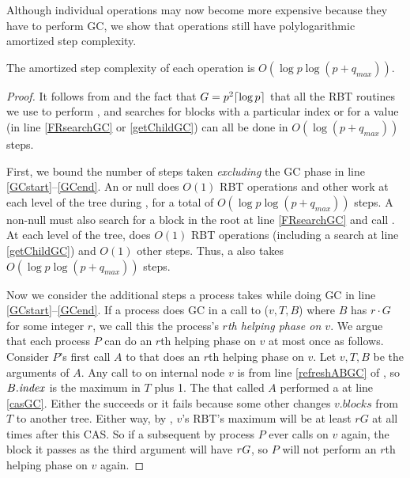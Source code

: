 Although individual operations may now become more expensive because they have to perform GC,
we show that operations still have polylogarithmic amortized step complexity.

\begin{proposition}
The amortized step complexity of each operation is $O(\log p \log(p+q_{max}))$.
\end{proposition}
\begin{proof}
It follows from  and the fact that $G=p^2\lceil \log p \rceil$
that all the RBT routines we use to perform ,  and searches for
blocks with a particular index or for a  value (in line \ref{FRsearchGC} or \ref{getChildGC}) can all be done in $O(\log(p+q_{max}))$ steps.

First, we bound the number of steps taken \emph{excluding} the GC phase in line \ref{GCstart}--\ref{GCend}.
An  or null  does $O(1)$ RBT operations and other work at each level of the tree during ,
for a total of $O(\log p \log(p+q_{max}))$ steps.
A non-null  must also search for a block in the root at line \ref{FRsearchGC}
and call .  At each level of the tree,  does $O(1)$ RBT operations (including a search at line \ref{getChildGC}) and $O(1)$ other steps.
Thus, a  also takes $O(\log p \log(p+q_{max}))$ steps.

Now we consider the additional steps a process takes while doing GC in line \ref{GCstart}--\ref{GCend}.
If a process does GC in a call to ($v,T,B$) where $B$ has  $r\cdot G$ for some integer $r$, we call this the process's \emph{$r$th helping phase on $v$}.
We argue that each process $P$ can do an $r$th helping phase on $v$ at most once as follows.
Consider $P$'s first call $A$ to  that does an $r$th helping phase on $v$.
Let $v,T,B$ be the arguments of $A$.
Any call to  on internal node $v$ is from line \ref{refreshABGC} of , so $B.\mbox{\textit{index}}$
is the maximum  in $T$ plus 1.
The  that called $A$ performed a  at line \ref{casGC}.  Either the  succeeds
or it fails because 
some other  changes $v.blocks$ from $T$ to another tree.
Either way, by , $v$'s RBT's maximum  will be at least $rG$ at all times
after this CAS.
So if a subsequent  by process $P$ 
ever calls  on $v$ again, the block it passes as the third argument
will have $\index>rG$, so $P$ will not perform an $r$th helping phase on $v$ again.


\end{proof}
